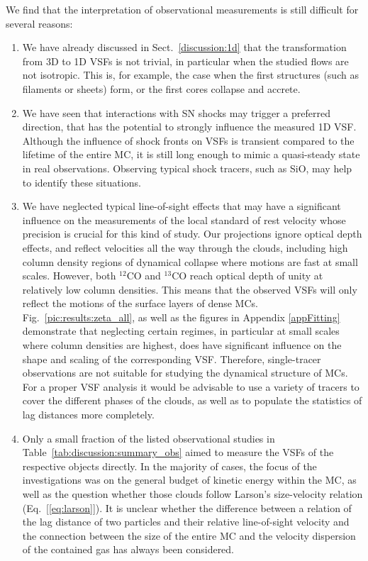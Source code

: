 \documentclass{aa}		%
\begin{document}
We find that the interpretation of observational measurements is still difficult for several reasons:
\begin{enumerate}
    \item We have already discussed in Sect.~\ref{discussion:1d} that the transformation from 3D to 1D VSFs is not trivial, in particular when the studied flows are not isotropic.
    This is, for example, the case when the first structures (such as filaments or sheets) form, or the first cores collapse and accrete.
    \item We have seen that interactions with SN shocks may trigger a preferred direction, that has the potential to strongly influence the measured 1D VSF.
    Although the influence of shock fronts on VSFs is transient compared to the lifetime of the entire MC, it is still long enough to mimic a quasi-steady state in real observations.
    Observing typical shock tracers, such as SiO, may help to identify these situations. 
    \item We have neglected typical line-of-sight effects that may have a significant influence on the measurements of the local standard of rest velocity whose precision is crucial for this kind of study.
    Our projections ignore optical depth effects, and reflect velocities all the way through the clouds, including high column density regions of dynamical collapse where motions are fast at small scales.
    However,  both $^{12}$CO and $^{13}$CO reach optical depth of unity at relatively low column densities. 
    This means that the observed VSFs will only reflect the motions of the surface layers of dense MCs. 
    Fig.~\ref{pic:results:zeta_all}, as well as the figures in Appendix \ref{appFitting} demonstrate that neglecting certain regimes, in particular at small scales where column densities are highest, does have significant influence on the shape and scaling of the corresponding VSF.
    Therefore, single-tracer observations are not suitable for studying the dynamical structure of MCs. 
    For a proper VSF analysis it would be advisable to use a variety of tracers to cover the different phases of the clouds, as well as to populate the statistics of lag distances more completely.
    \item Only a small fraction of the listed observational studies in Table~\ref{tab:discussion:summary_obs} aimed to measure the VSFs of the respective objects directly.
    In the majority of cases, the focus of the investigations was on the general budget of kinetic energy within the MC, as well as the question whether those clouds follow Larson's size-velocity relation (Eq.~[\ref{eq:larson}]).
    It is unclear whether the difference between a relation of the lag distance of two particles and their relative line-of-sight velocity and the connection between the size of the entire MC and the velocity dispersion of the contained gas has always been considered.
\end{enumerate}
\end{document}
